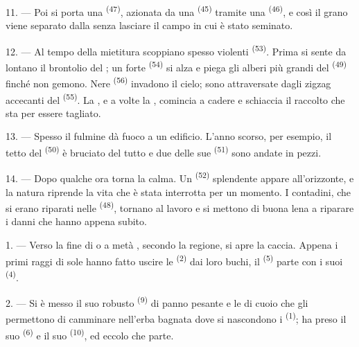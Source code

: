 11. --- Poi si porta una  \textsuperscript{(47)}, azionata da una
 \textsuperscript{(45)} tramite una 
\textsuperscript{(46)}, e così il grano viene separato dalla  senza
lasciare il campo in cui è stato seminato.

\VUsaut{5.0mm}
\VUsaut{3.4mm}

12. --- Al tempo della mietitura scoppiano spesso violenti 
\textsuperscript{(53)}. Prima si sente da lontano il brontolio del ; un
forte  \textsuperscript{(54)} si alza e piega gli alberi più
grandi del  \textsuperscript{(49)} finché non gemono. Nere
 \textsuperscript{(56)} invadono il cielo; sono attraversate dagli
zigzag accecanti del  \textsuperscript{(55)}. La , e a
volte la , comincia a cadere e schiaccia il raccolto che sta per
essere tagliato.

13. --- Spesso il fulmine dà fuoco a un edificio. L'anno scorso, per esempio, il tetto
del  \textsuperscript{(50)} è bruciato del tutto e due delle sue
 \textsuperscript{(51)} sono andate in pezzi.

14. --- Dopo qualche ora torna la calma. Un  \textsuperscript{(52)}
splendente appare all'orizzonte, e la natura riprende la vita che è stata interrotta
per un momento. I contadini, che si erano riparati nelle 
\textsuperscript{(48)}, tornano al lavoro e si mettono di buona lena a riparare i
danni che hanno appena subito.

\VUsaut{6.0mm}
\VUsaut{3.6mm}

\VUsaut{1.4mm}
\VUsaut{4.0mm}

1. --- Verso la fine di  o a metà , secondo la
regione, si apre la caccia. Appena i primi raggi di sole hanno fatto uscire le
 \textsuperscript{(2)} dai loro buchi, il 
\textsuperscript{(5)} parte con i suoi  \textsuperscript{(4)}.

2. --- Si è messo il suo robusto  \textsuperscript{(9)} di
panno pesante e le  di cuoio che gli permettono di camminare nell'erba
bagnata dove si nascondono i  \textsuperscript{(1)}; ha preso il suo
 \textsuperscript{(6)} e il suo 
\textsuperscript{(10)}, ed eccolo che parte.

